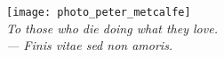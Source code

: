 %
%

\pubmode
	\onecolumngrid
\fi

\vspace*{180pt}
\begin{center}
	\texttt{[image: photo\_peter\_metcalfe]}\\
	\textit{To those who die doing what they love.\\ --- Finis vitae sed non amoris.}
\end{center}
\newpage

\pubmode
	\twocolumngrid
\fi
